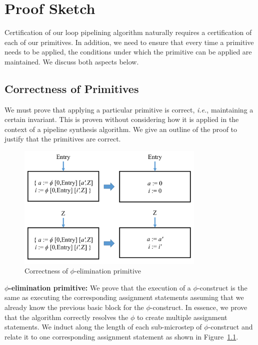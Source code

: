 \chapter{Proof Sketch}
\label{sec:proof}

Certification of our loop pipelining algorithm naturally requires a certification of 
each of our primitives. In addition, we need to ensure that every time a primitive 
needs to be applied, the conditions under which the primitive can be applied are 
maintained. We discuss both aspects below.

\section{Correctness of Primitives}
We must prove that applying a particular primitive is correct, 
{\em i.e.}, maintaining a certain invariant. This is proven without
considering how it is applied in the context of a pipeline
synthesis algorithm. We give an outline of the proof to justify 
that the primitives are correct.
  
\begin{figure}[H]
\begin{center}
\includegraphics[height=2.35in]{fig-proposal/phi-removal-transformation-proof}
\end{center}
\caption{Correctness of $\phi$-elimination primitive}
\label{fig:phi-primitive-proof}
\end{figure}

{\bf $\phi$-elimination primitive:} We prove that the execution
  of a $\phi$-construct is the same as executing the corresponding
  assignment statements assuming that we already know the previous basic block for the $\phi$-construct.
  In essence, we prove that the algorithm correctly resolves the $\phi$ to create 
  multiple assignment statements. We induct along the length of each sub-microstep of $\phi$-construct and
  relate it to one corresponding assignment statement as shown in Figure~\ref{fig:phi-primitive-proof}. 
  
